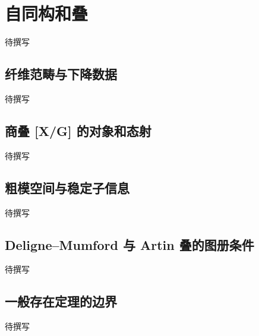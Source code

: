 
% 
% 
% 
% 

\section{自同构和叠}
\label{g5:sec:3405}

待撰写

\subsection{纤维范畴与下降数据}
\label{g5:subsec:3405:01}
待撰写

\subsection{商叠 [X/G] 的对象和态射}
\label{g5:subsec:3405:02}
待撰写

\subsection{粗模空间与稳定子信息}
\label{g5:subsec:3405:03}
待撰写

\subsection{Deligne–Mumford 与 Artin 叠的图册条件}
\label{g5:subsec:3405:04}
待撰写

\subsection{一般存在定理的边界}
\label{g5:subsec:3405:05}
待撰写

